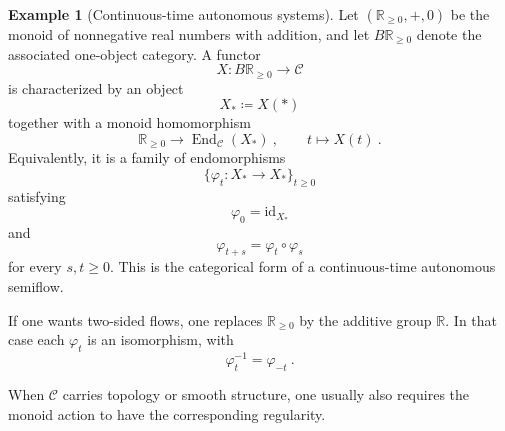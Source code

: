 \documentclass[a4paper,reqno,oneside]{amsart}
\theoremstyle{definition}
\newtheorem{example}[theorem]{Example}
\theoremstyle{remark}
\newcommand{\id}{\mathrm{id}}
\numberwithin{equation}{section}
\begin{document}
	\begin{example}[Continuous-time autonomous systems]
		Let $(\mathbb R_{\geq 0},+,0)$ be the monoid of nonnegative real numbers
		with addition, and let $B\mathbb R_{\geq 0}$ denote the associated
		one-object category. A functor
		\begin{equation}
			X\colon B\mathbb R_{\geq 0}\to\mathcal C
		\end{equation}
		is characterized by an object
		\begin{equation}
			X_*\coloneqq X(*)
		\end{equation}
		together with a monoid homomorphism
		\begin{equation}
			\mathbb R_{\geq 0}
			\longrightarrow
			\operatorname{End}_{\mathcal C}(X_*) \ ,
			\qquad
			t\longmapsto X(t) \ .
		\end{equation}
		Equivalently, it is a family of endomorphisms
		\begin{equation}
			\{\varphi_t\colon X_*\to X_*\}_{t\geq 0}
		\end{equation}
		satisfying
		\begin{equation}
			\varphi_0=\id_{X_*}
		\end{equation}
		and
		\begin{equation}
			\varphi_{t+s}=\varphi_t\circ\varphi_s
		\end{equation}
		for every $s,t\geq 0$. This is the categorical form of a continuous-time
		autonomous semiflow.
		
		If one wants two-sided flows, one replaces $\mathbb R_{\geq 0}$ by the
		additive group $\mathbb R$. In that case each $\varphi_t$ is an
		isomorphism, with
		\begin{equation}
			\varphi_t^{-1}=\varphi_{-t} \ .
		\end{equation}
		
		When $\mathcal C$ carries topology or smooth structure, one usually also
		requires the monoid action to have the corresponding regularity.
	\end{example}
	
	
	
\end{document}
